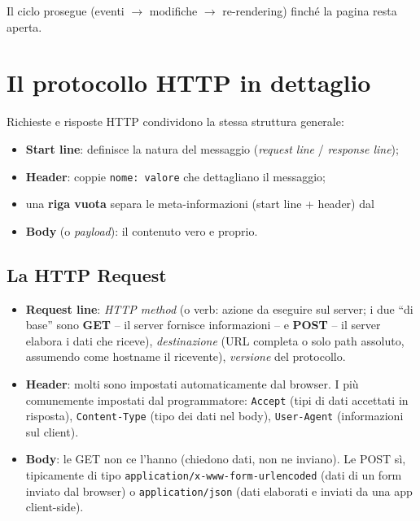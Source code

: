 Il ciclo prosegue (eventi $\rightarrow$ modifiche $\rightarrow$ re-rendering) finch\'e la
pagina resta aperta.

\section{Il protocollo HTTP in dettaglio}

\begin{definizione}
Richieste e risposte HTTP condividono la stessa struttura generale:
\begin{itemize}
  \item \textbf{Start line}: definisce la natura del messaggio
        (\emph{request line} / \emph{response line});
  \item \textbf{Header}: coppie \texttt{nome: valore} che dettagliano il messaggio;
  \item una \textbf{riga vuota} separa le meta-informazioni (start line + header) dal
  \item \textbf{Body} (o \emph{payload}): il contenuto vero e proprio.
\end{itemize}
\end{definizione}

\subsection{La HTTP Request}
\begin{itemize}
  \item \textbf{Request line}: \emph{HTTP method} (o verb: azione da eseguire sul server;
        i due ``di base'' sono \textbf{GET} -- il server fornisce informazioni -- e
        \textbf{POST} -- il server elabora i dati che riceve), \emph{destinazione}
        (URL completa o solo path assoluto, assumendo come hostname il ricevente),
        \emph{versione} del protocollo.
  \item \textbf{Header}: molti sono impostati automaticamente dal browser. I pi\`u
        comunemente impostati dal programmatore: \texttt{Accept} (tipi di dati accettati in
        risposta), \texttt{Content-Type} (tipo dei dati nel body), \texttt{User-Agent}
        (informazioni sul client).
  \item \textbf{Body}: le GET non ce l'hanno (chiedono dati, non ne inviano). Le POST s\`i,
        tipicamente di tipo \texttt{application/x-www-form-urlencoded} (dati di un form
        inviato dal browser) o \texttt{application/json} (dati elaborati e inviati da una app
        client-side).
\end{itemize}

